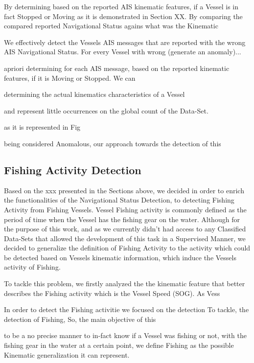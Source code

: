 By determining based on the reported AIS kinematic features, if a Vessel is in fact Stopped or Moving as it is demonstrated in Section XX. By comparing the compared reported Navigational Status agains what was the Kinematic  

We effectively detect the Vessels AIS messages that are reported with the wrong AIS Navigational Status. For every Vessel with wrong (generate an anomaly)...


apriori determining for each AIS message, based on the reported kinematic features, if it is Moving or Stopped. We can 

determining the actual kinematics characteristics of a Vessel

and represent little occurrences on the global count of the Data-Set.

as it is represented in Fig

being considered Anomalous, our approach towards the detection of this  

\subsection{Fishing Activity Detection}
Based on the xxx presented in the Sections above, we decided in order to enrich the functionalities of the Navigational Status Detection, to detecting Fishing Activity from Fishing Vessels. Vessel Fishing activity is commonly defined as the period of time when the Vessel has the fishing gear on the water. Although for the purpose of this work, and as we currently didn't had access to any Classified Data-Sets that allowed the development of this task in a Supervised Manner, we decided to generalize the definition of Fishing Activity to the activity which could be detected based on Vessels kinematic information, which induce the Vessels activity of Fishing. 

To tackle this problem, we firstly analyzed the the kinematic feature that better describes the Fishing activity which is the Vessel Speed (SOG). As Vess


In order to detect the Fishing activitie we focused on the detection 
To tackle, the detection of Fishing, So, the main objective of this  


to be a no precise manner to in-fact know if a Vessel was fishing or not, with the fishing gear in the water at a certain point, we define Fishing as the possible Kinematic generalization it can represent.





